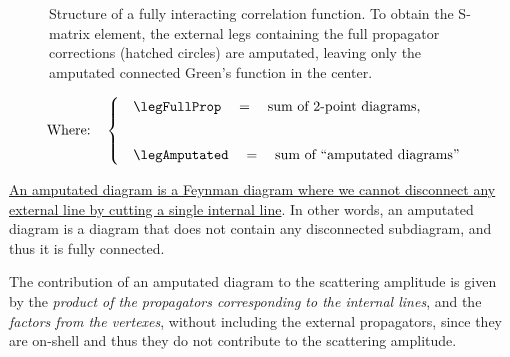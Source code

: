 \begin{figure}[H]
\begin{minipage}{0.6\textwidth}
    \end{minipage}
    \hfill
    \begin{minipage}{0.35\textwidth}
        \caption{Structure of a fully interacting correlation function. To obtain the S-matrix element, the external legs containing the full propagator corrections (hatched circles) are amputated, leaving only the amputated connected Green's function in the center.}
    \end{minipage}
    \label{fig:amputated_diagram}
\end{figure}
\begin{equation*}
    \text{Where:} \quad
    \begin{cases}
        \quad \legFullProp \quad = \quad \text{sum of 2-point diagrams,} \\[20pt]
        \quad \legAmputated \quad = \quad \text{sum of ``amputated diagrams''}
    \end{cases}
\end{equation*}

\begin{definition}
    \uline{An amputated diagram is a Feynman diagram where we cannot disconnect any external line by cutting a single internal line}. In other words, an amputated diagram is a diagram that does not contain any disconnected subdiagram, and thus it is fully connected.

    The contribution of an amputated diagram to the scattering amplitude is given by the \textit{product of the propagators corresponding to the internal lines}, and the \textit{factors from the vertexes}, without including the external propagators, since they are on-shell and thus they do not contribute to the scattering amplitude.
\end{definition}

